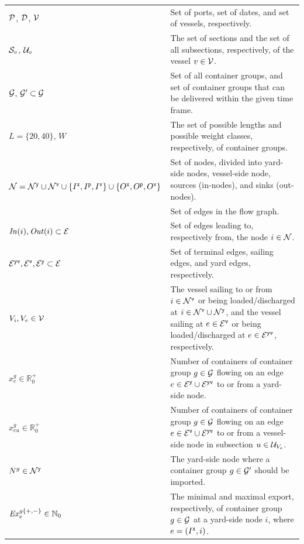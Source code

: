 \begin{table}[htbp]
\begin{tabular}{p{4cm}p{10.5cm}}
$\mathcal{P}$, $\mathcal{D}$, $\mathcal{V}$	& Set of ports, set of dates, and set of vessels, respectively.\\
$\mathcal{S}_v$, $\mathcal{U}_v$				& The set of sections and the set of all subsections, respectively, of the vessel $v\in\mathcal{V}$.\\ 
$\mathcal{G}$, $\mathcal{G}'\subset \mathcal{G}$
															& Set of all container groups, and set of container groups that can be delivered within the given time frame.\\
$L=\{20,40\}$, $W$						& The set of possible lengths and possible weight classes, respectively, of container groups.\\
\multirow{2}{4.2cm}{$\mathcal{N} = \mathcal{N}^\texttt{y}\cup \mathcal{N}^\texttt{v} \cup \{I^\texttt{x},I^\texttt{p},I^\texttt{v}\} \cup \{O^\texttt{x}, O^\texttt{p},O^\texttt{v}\}$}														 
															& Set of nodes, divided into yard-side nodes, vessel-side node, sources (in-nodes), and sinks (out-nodes). \\
$\mc{E}$									 		& Set of edges in the flow graph.\\
$\mathit{In}(i),\mathit{Out}(i)\subset \mathcal{E}$	
															& Set of edges leading to, respectively from, the node $i\in\mathcal{N}$.\\
$\mathcal{E}^\texttt{yv}, \mathcal{E}^\texttt{v}, \mathcal{E}^\texttt{y}\subset\mathcal{E}$
															& Set of terminal edges, sailing edges, and yard edges, respectively.\\
$V_i, V_e\in\mathcal{V}$						& The vessel sailing to or from $i\in \mathcal{N}^\texttt{v}$ or being loaded/discharged at $i\in\mathcal{N}^\texttt{v}\cup\mathcal{N}^\texttt{y}$, and the vessel sailing at $e\in\mathcal{E}^\texttt{v}$ or being loaded/discharged at $e\in\mathcal{E}^\texttt{yv}$, respectively.\\ 
\hline
$x^g_e\in\mathbb{R}^+_0$			& Number of containers of container group $g\in \mathcal{G}$ flowing on an edge $e\in \mathcal{E}^\texttt{y}\cup\mathcal{E}^\texttt{yv}$ to or from a yard-side node.\\
$x^{g}_{eu}\in\mathbb{R}^+_0$	&	Number of containers of container group $g\in\mathcal{G}$ flowing on an edge $e\in\mathcal{E}^\texttt{v}\cup\mathcal{E}^\texttt{yv}$ to or from a vessel-side node in subsection $u\in \mathcal{U}_{V_e}$.\\
\hline
$N^g\in\mathcal{N}^\texttt{y}$		 		& The yard-side node where a container group $g\in \mathcal{G}'$ should be imported.\\
$\mathit{Ex}^{g\{+,-\}}_e\in\mathbb{N}_0$	
															& The minimal and maximal export, respectively, of container group $g\in \mathcal{G}$ at a yard-side node $i$, where $e=(I^\texttt{x},i)$.\\

\end{tabular}
\end{table}
